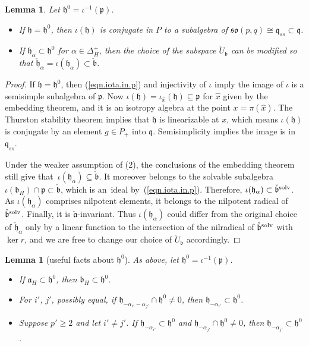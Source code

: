 \documentclass[pdftex]{sigma}
\numberwithin{equation}{section}
\newtheorem{lem}[thm]{Lemma}
\theoremstyle{definition}
\newcommand{\lieh}{\mathfrak{h}}
\def\p{{\mathfrak p}}
\def\q{{\mathfrak q}}
\def\a{{\mathfrak a}}
\def\b{{\mathfrak b}}
\newcommand{\so}{\mathfrak{so}}
\begin{document}
\begin{lem}\label{lem.lots.in.h0}
Let $\lieh^0 = \iota^{-1}(\p)$.
\begin{itemize}\itemsep=0pt
\item[$(1)$] If $\lieh = \lieh^0$, then $\iota(\lieh)$ is conjugate in $P$ to a subalgebra of $\so(p,q) \cong \q_{ss} \subset \q$.
\item[$(2)$] If $\lieh_\alpha \subset \lieh^0$ for $\alpha \in \Delta^+_H$, then the choice of the subspace $\check{U}_\b$ can be modified so that ${\check{\lieh}_\alpha = \iota(\lieh_\alpha) \subset \check{\b}}$.
\end{itemize}
\end{lem}

\begin{proof}
If $\lieh=\lieh^0$, then (\ref{eqn.iota.in.p}) and injectivity of $\iota$ imply the image of $\iota$ is a semisimple subalgebra of $\p$. Now $\iota(\lieh) = \iota_{\hat{x}}(\lieh) \subseteq \p$ for $\hat{x}$ given by the embedding theorem, and it is an isotropy algebra at the point $x = \pi(\hat{x})$.
The Thurston stability theorem \cite[Theorem~3]{thurston.reeb.stability} implies that $\lieh$ is linearizable at $x$, which means $\iota(\lieh)$ is conjugate by an element $g \in P_+$ into $\q$.
Semisimplicity implies the image is in $\q_{ss}$.

 Under the weaker assumption of (2), the conclusions of the embedding theorem still give that~$\iota(\lieh_\alpha) \subseteq \check{\b}$. It moreover belongs to the solvable subalgebra $\iota(\b_H) \cap \p \subset \check{\b}$, which is an~ideal by~(\ref{eqn.iota.in.p}). Therefore, $\iota(\lieh_\alpha) \subset \check{\b}^{\rm solv}$. As $\iota(\lieh_\alpha)$ comprises nilpotent elements, it belongs to the nilpotent radical of $\check{\b}^{\rm solv}$. Finally, it is $\check{\a}$-invariant. Thus $\iota(\lieh_\alpha)$ could differ from the original choice of $\check{\lieh}_\alpha$ only by a linear function to the intersection of the nilradical of $\check{\b}^{\rm solv}$ with $\ker r$, and we are free to change our choice of $\check{U}_{\b}$ accordingly.
\end{proof}

\begin{lem}[useful facts about $\lieh^0$]
\label{lem.about.h0}
As above, let $\lieh^0 = \iota^{-1}(\p)$.
\begin{itemize}\itemsep=0pt
\item[$(1)$] If $\a_H \subset \lieh^0$, then $\b_H \subset \lieh^0$.
\item[$(2)$] For $i'$, $j'$, possibly equal, if $\lieh_{- \alpha_{i'} - \alpha_{j'}} \cap \lieh^0 \neq 0$, then $\lieh_{- \alpha_{i'}} \subset \lieh^0$.
\item[$(3)$] Suppose $p' \geq 2$ and let $i' \neq j'$. If $\lieh_{-\alpha_{i'}} \subset \lieh^0$ and $\lieh_{- \alpha_{j'}} \cap \lieh^0 \neq 0$, then $\lieh_{-\alpha_{j'}} \subset \lieh^0$.
\end{itemize}
\end{lem}
\end{document}

